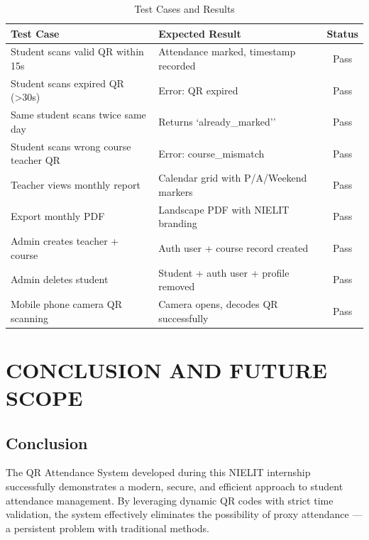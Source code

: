 \documentclass{SOICTthesis}
\begin{document}
\begin{table}[H]
\centering
\caption{Test Cases and Results}
\label{tab:test_cases}
\begin{tabular}{|p{4.5cm}|p{5cm}|c|}
    \hline
    \textbf{Test Case} & \textbf{Expected Result} & \textbf{Status} \\
    \hline
    Student scans valid QR within 15s & Attendance marked, timestamp recorded & Pass \\
    \hline
    Student scans expired QR (>30s) & Error: QR expired & Pass \\
    \hline
    Same student scans twice same day & Returns `already\_marked'' & Pass \\
    \hline
    Student scans wrong course teacher QR & Error: course\_mismatch & Pass \\
    \hline
    Teacher views monthly report & Calendar grid with P/A/Weekend markers & Pass \\
    \hline
    Export monthly PDF & Landscape PDF with NIELIT branding & Pass \\
    \hline
    Admin creates teacher + course & Auth user + course record created & Pass \\
    \hline
    Admin deletes student & Student + auth user + profile removed & Pass \\
    \hline
    Mobile phone camera QR scanning & Camera opens, decodes QR successfully & Pass \\
    \hline
\end{tabular}
\end{table}


\chapter{CONCLUSION AND FUTURE SCOPE}
\label{ch:conclusion}

\section{Conclusion}
\label{sec:conclusion}

The QR Attendance System developed during this NIELIT internship successfully demonstrates a modern, secure, and efficient approach to student attendance management. By leveraging dynamic QR codes with strict time validation, the system effectively eliminates the possibility of proxy attendance --- a persistent problem with traditional methods.
\end{document}
